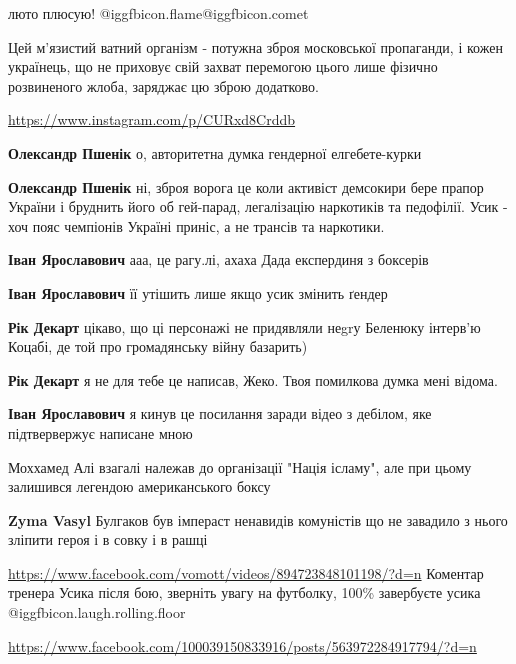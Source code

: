 \begin{itemize}
люто плюсую!  @igg{fbicon.flame}@igg{fbicon.comet} ️ 


Цей м'язистий ватний організм - потужна зброя московської пропаганди, і кожен
українець, що не приховує свій захват перемогою цього лише фізично розвиненого
жлоба, заряджає цю зброю додатково.

\url{https://www.instagram.com/p/CURxd8Crddb}

\begin{itemize} %
\textbf{Олександр Пшенік} о, авторитетна думка гендерної елгебете-курки

\textbf{Олександр Пшенік} ні, зброя ворога це коли активіст демсокири бере прапор України і бруднить його об гей-парад, легалізацію наркотиків та педофілії.
Усик - хоч пояс чемпіонів Україні приніс, а не трансів та наркотики.

\textbf{Іван Ярославович} ааа, це рагу.лі, ахаха
Дада експердиня з боксерів

\textbf{Іван Ярославович} її утішить лише якщо усик змінить ґендер

\textbf{Рік Декарт} цікаво, що ці персонажі не придявляли неgrу Беленюку інтерв'ю Коцабі, де той про громадянську війну базарить)

\textbf{Рік Декарт} я не для тебе це написав, Жеко. Твоя помилкова думка мені відома.

\textbf{Іван Ярославович} я кинув це посилання заради відео з дебілом, яке підтвервержує написане мною
\end{itemize} %


Моххамед Алі взагалі належав до організації "Нація ісламу", але при цьому
залишився легендою американського боксу

\begin{itemize} %
\textbf{Zyma Vasyl} Булгаков був імпераст ненавидів комуністів що не завадило з нього зліпити героя і в совку і в рашці
\end{itemize} %

\url{https://www.facebook.com/vomott/videos/894723848101198/?d=n}
Коментар тренера Усика після бою, зверніть увагу на футболку, 100\% завербуєте усика @igg{fbicon.laugh.rolling.floor} 

\url{https://www.facebook.com/100039150833916/posts/563972284917794/?d=n}


\end{itemize}
